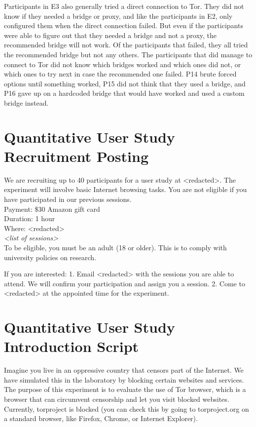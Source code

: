 \documentclass[USenglish,oneside,twocolumn]{article}
\begin{document}
Participants in E3 also generally tried a direct connection to Tor. They did not know if they needed a bridge or proxy, and like the participants in E2, only configured them when the direct connection failed. But even if the participants were able to figure out that they needed a bridge and not a proxy, the recommended bridge will not work. Of the participants that failed, they all tried the recommended bridge but not any others. The participants that did manage to connect to Tor did not know which bridges worked and which ones did not, or which ones to try next in case the recommended one failed. P14 brute forced options until something worked, P15 did not think that they used a bridge, and P16 gave up on a hardcoded bridge that would have worked and used a custom bridge instead.

\section{Quantitative User Study Recruitment Posting}
\label{quantitative-recruitment}
We are recruiting up to 40 participants for a user study at <redacted>. %
The experiment will involve basic Internet browsing tasks. You are not eligible if you have participated in our previous sessions.\\

\indent Payment: \$30 Amazon gift card\\
\indent Duration: 1 hour \\
\indent Where: <redacted> \\ %

\textit{<list of sessions>}\\

To be eligible, you must be an adult (18 or older). This is to comply with university policies on research. 

If you are interested: 1. Email <redacted> %
with the sessions you are able to attend. We will confirm your participation and assign you a session. 
2. Come to <redacted> %
at the appointed time for the experiment.

\section{Quantitative User Study Introduction Script} 
\label{quantitative-script} 
Imagine you live in an oppressive country that censors part of the Internet. We have simulated this in the laboratory by blocking certain websites and services.  The purpose of this experiment is to evaluate the use of Tor browser, which is a browser that can circumvent censorship and let you visit blocked websites. Currently, torproject is blocked (you can check this by going to torproject.org on a standard browser, like Firefox, Chrome, or Internet Explorer). 
\end{document}
